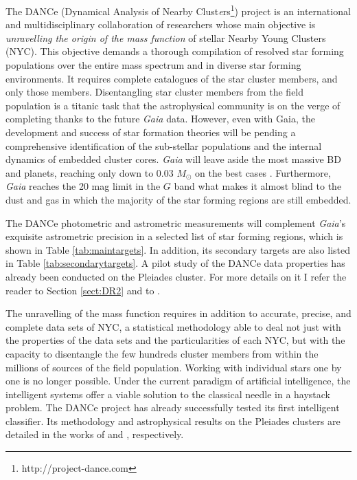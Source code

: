 The DANCe (Dynamical Analysis of Nearby Clust\emph{e}rs\footnote{http://project-dance.com}) project is an international and multidisciplinary collaboration of researchers whose main objective is \textsl{unravelling the origin of the mass function} of stellar Nearby Young Clusters (NYC). This objective demands a thorough compilation of resolved star forming populations over the entire mass spectrum and in diverse star forming environments. It requires complete catalogues of the star cluster members, and only those members. Disentangling star cluster members from the field population is a titanic task that the astrophysical community is on the verge of completing thanks to the future \emph{Gaia} \citep{GAIA} data. However, even with Gaia, the development and success of star formation theories will be pending a comprehensive identification of the sub-stellar populations and the internal dynamics of embedded cluster cores. \emph{Gaia} will leave aside the most massive BD and planets, reaching only down to 0.03 $M_{\odot}$ on the best cases \citep{Sarro2013}. Furthermore, \emph{Gaia} reaches the 20 mag limit in the $G$ band \cite[350 nm to 1000 nm][]{2010A&A...523A..48J} what makes it almost blind to the dust and gas in which the majority of the star forming regions are still embedded. 

The DANCe photometric and astrometric measurements will complement \emph{Gaia}'s exquisite astrometric precision in a selected list of star forming regions, which is shown in Table \ref{tab:maintargets}. In addition, its secondary targets are also listed in Table \ref{tab:secondarytargets}. A pilot study of the DANCe data properties has already been conducted on the Pleiades cluster. For more details on it I refer the reader to Section \ref{sect:DR2} and to \citet{Bouy2013}.




The unravelling of the mass function requires in addition to accurate, precise, and complete data sets of NYC, a statistical methodology able to deal not just with the properties of the data sets and the particularities of each NYC, but with the capacity to disentangle the few hundreds cluster members from within the millions of sources of the field population. Working with individual stars one by one is no longer possible. Under the current paradigm of artificial intelligence, the intelligent systems offer a viable solution to the classical needle in a haystack problem. The DANCe project has already successfully tested its first intelligent classifier. Its methodology and astrophysical results on the Pleiades clusters are detailed in the works of \citet{Sarro2014} and \citet{Bouy2015}, respectively. 

